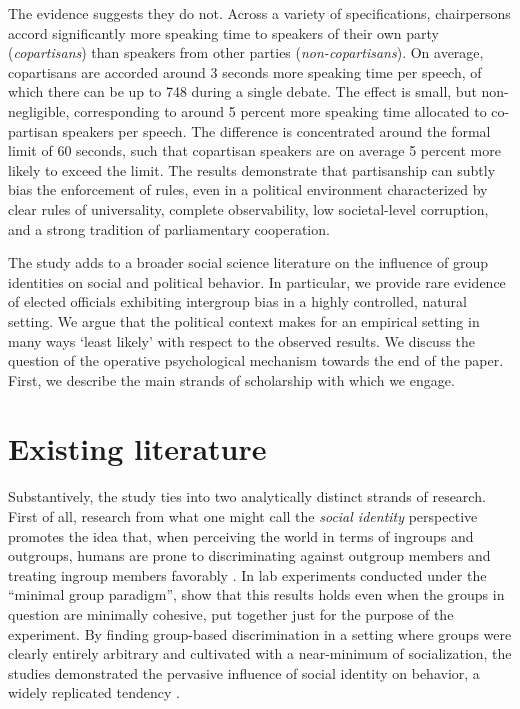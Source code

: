 \documentclass[12pt,a4paper]{article}
\begin{document}
The evidence suggests they do not. Across a variety of specifications, chairpersons accord significantly more speaking time to speakers of their own party (\textit{copartisans}) than speakers from other parties (\textit{non-copartisans}). On average, copartisans are accorded around 3 seconds more speaking time per speech, of which there can be up to 748 during a single debate. The effect is small, but non-negligible, corresponding to around 5 percent more speaking time allocated to co-partisan speakers per speech. The difference is concentrated around the formal limit of 60 seconds, such that copartisan speakers are on average 5 percent more likely to exceed the limit. The results demonstrate that partisanship can subtly bias the enforcement of rules, even in a political environment characterized by clear rules of universality, complete observability, low societal-level corruption, and a strong tradition of parliamentary cooperation.

The study adds to a broader social science literature on the influence of group identities on social and political behavior. In particular, we provide rare evidence of elected officials exhibiting intergroup bias in a highly controlled, natural setting. We argue that the political context makes for an empirical setting in many ways `least likely' with respect to the observed results. We discuss the question of the operative psychological mechanism towards the end of the paper. First, we describe the main strands of scholarship with which we engage.

\section{Existing literature}

Substantively, the study ties into two analytically distinct strands of research. First of all, research from what one might call the \textit{social identity} perspective promotes the idea that, when perceiving the world in terms of ingroups and outgroups, humans are prone to discriminating against outgroup members and treating ingroup members favorably \citep{Hewstone2002}. In lab experiments conducted under the ``minimal group paradigm'', \cite{Tajfel1979,Tajfel1986} show that this results holds even when the groups in question are minimally cohesive, put together just for the purpose of the experiment. By finding group-based discrimination in a setting where groups were clearly entirely arbitrary and cultivated with a near-minimum of socialization, the studies demonstrated the pervasive influence of social identity on behavior, a widely replicated tendency \citep{Brewer1979, Abrams1990, Brown2000, Chen2009}.
\end{document}
